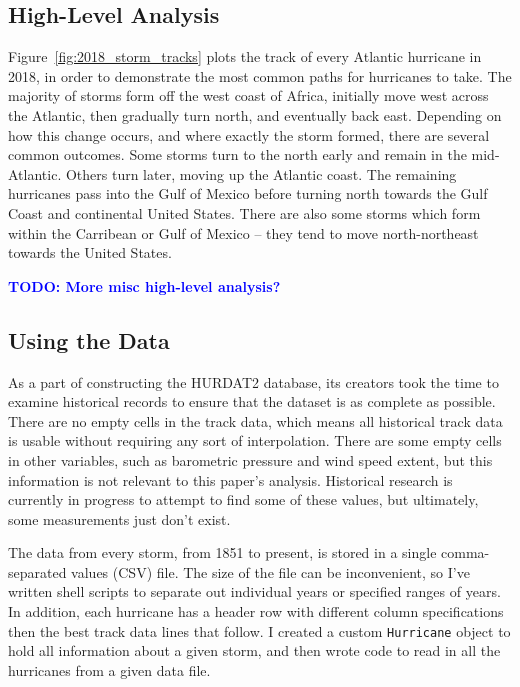 \subsection{High-Level Analysis}

\par
Figure~\ref{fig:2018_storm_tracks} plots the track of every Atlantic hurricane in 2018, in order to demonstrate the most common paths for hurricanes to take.
The majority of storms form off the west coast of Africa, initially move west across the Atlantic, then gradually turn north, and eventually back east.
Depending on how this change occurs, and where exactly the storm formed, there are several common outcomes.
Some storms turn to the north early and remain in the mid-Atlantic.
Others turn later, moving up the Atlantic coast.
The remaining hurricanes pass into the Gulf of Mexico before turning north towards the Gulf Coast and continental United States.
There are also some storms which form within the Carribean or Gulf of Mexico -- they tend to move north-northeast towards the United States.

\par
\textcolor{blue}{\textbf{TODO: More misc high-level analysis?}}

\subsection{Using the Data}

\par
As a part of constructing the HURDAT2 database, its creators took the time to examine historical records to ensure that the dataset is as complete as possible.
There are no empty cells in the track data, which means all historical track data is usable without requiring any sort of interpolation.
There are some empty cells in other variables, such as barometric pressure and wind speed extent, but this information is not relevant to this paper's analysis.
Historical research is currently in progress to attempt to find some of these values, but ultimately, some measurements just don't exist.

\par
The data from every storm, from 1851 to present, is stored in a single comma-separated values (CSV) file.
The size of the file can be inconvenient, so I've written shell scripts to separate out individual years or specified ranges of years.
In addition, each hurricane has a header row with different column specifications then the best track data lines that follow.
I created a custom \texttt{Hurricane} object to hold all information about a given storm, and then wrote code to read in all the hurricanes from a given data file.